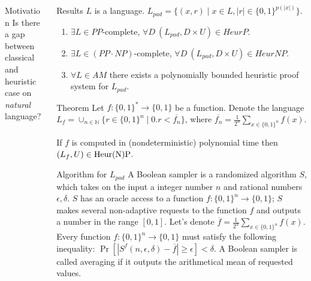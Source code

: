 \begin{frame}{}
\begin{columns}[t]
\begin{column}{0.32\linewidth}
\begin{block}{Motivation}
            Is there a gap between classical and heuristic case on {\em natural}
            language?
        \end{block}
    \end{column}%

	\begin{column}{0.32\linewidth}
        
		
        \begin{block}{Results}
            $L$ is a language.
		    $L_{pad} = \{(x, r) \mid x \in L, |r| \in \{0, 1 \}^{p(|x|)}\}$.
    
		    \begin{enumerate}
				\item $\exists L \in PP$-complete, $\forall D~
		    		(L_{pad}, D \times U) \in HeurP$.
		    	\item $\exists L \in (PP \cdot NP)$-complete, $\forall D~
				    (L_{pad}, D \times U) \in HeurNP$.
		    	\item $\forall L \in AM$ there exists a polynomially bounded
    				heuristic proof system for $L_{pad}$.
            \end{enumerate}
        \end{block}

        \begin{alertblock}{Theorem}
            Let $f:\{0,1\}^* \to \{0,1\}$ be a function. Denote the language
            $L_f = \cup_{n \in \mathbb{N}} \{r \in \{0, 1\}^n \mid 0.r <
            \overline{f_n} \}$, where $\overline{f_n} = \frac{1}{2^n}
            \sum_{x \in \{0,1\}^n}f(x)$.

            If $f$ is computed in (nondeterministic) polynomial time then $(L_f,U)
            \in \rm Heur(N)P$. 
        \end{alertblock}

        \begin{block}{Algorithm for $L_{pad}$}
            A Boolean sampler is a randomized algorithm $S$, which takes on the input
			a integer number $n$ and rational numbers $\epsilon, \delta$.  $S$ has an
            oracle access to a function $f:\{0,1\}^n \to \{0,1\}$; $S$ makes several
            non-adaptive requests to the function $f$ and outputs a number in the
            range $[0,1]$. Let's denote $\overline{f} =
            \frac{1}{2^n}\sum_{x \in \{0,1\}^n}f(x)$. Every function
            $f:\{0,1\}^n \to \{0,1\}$ must satisfy the following inequality: 
			$\Pr[|S^f(n,\epsilon,\delta)-\overline{f}|\ge \epsilon]<\delta$.  A
            Boolean sampler is called averaging if it outputs the arithmetical mean
            of requested values.


\end{block}
\end{column}
\end{columns}
\end{frame}
